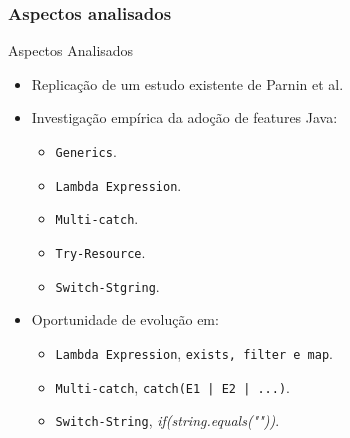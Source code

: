 \documentclass[]{beamer}
\begin{document}
		
	\begin{frame}[label=AspectosAnalisados]
		\frametitle{Aspectos analisados}
		\begin{block}{Aspectos Analisados}
			\begin{itemize}				
				\item Replicação de um estudo existente de Parnin et al.
				
				\item Investigação empírica da adoção de features Java:
					\begin{itemize}
						\item \texttt{Generics}.
						\item \texttt{Lambda Expression}.
						\item \texttt{Multi-catch}.
						\item \texttt{Try-Resource}.
						\item \texttt{Switch-Stgring}.
					\end{itemize}

				\item Oportunidade de evolução em:
					\begin{itemize}
						\item \texttt{Lambda Expression}, \texttt{exists, filter e map}.
						\item \texttt{Multi-catch}, \texttt{catch(E1 | E2 | ...)}.
						\item \texttt{Switch-String}, \textit{if(string.equals(""))}.
					\end{itemize}

			\end{itemize}
		\end{block}
	\end{frame}
	

	

	
%			
\end{document}
